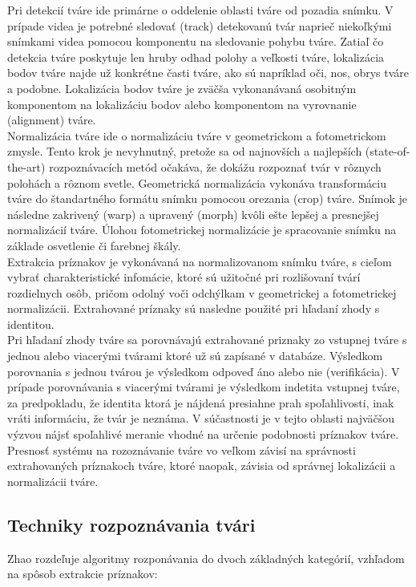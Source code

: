 \indent  Pri detekcií tváre ide primárne o oddelenie oblasti tváre od pozadia snímku.
V prípade videa je potrebné sledovať (track) detekovanú tvár naprieč niekoľkými snímkami videa pomocou komponentu na sledovanie pohybu tváre.
Zatiaľ čo detekcia tváre poskytuje len hruby odhad polohy a veľkosti tváre, lokalizácia bodov tváre najde už konkrétne časti tváre,
ako sú napríklad oči, nos, obrys tváre a podobne.
Lokalizácia bodov tváre je zväčša vykonanávaná osobitným komponentom na lokalizáciu bodov alebo komponentom na vyrovnanie (alignment) tváre.\cite{handbookface}\\
Normalizácia tváre ide o normalizáciu tváre v geometrickom a fotometrickom zmysle.
Tento krok je nevyhnutný, pretože sa od najnovších a najlepších (state-of-the-art) rozpoznávacích metód očakáva, že dokážu rozpoznať tvár v rôznych polohách a rôznom svetle.
Geometrická normalizácia vykonáva transformáciu tváre do štandartného formátu snímku pomocou orezania (crop) tváre.
Snímok je následne zakrivený (warp) a upravený (morph) kvôli ešte lepšej a presnejšej normalizácií tváre.
Úlohou fotometrickej normalizácie je spracovanie snímku na základe osvetlenie či farebnej škály.\cite{handbookface}\\
\indent Extrakcia príznakov je vykonávaná na normalizovanom snímku tváre, s cieľom vybrať charakteristické infomácie, ktoré sú užitočné pri rozlišovaní tvárí rozdielnych osôb,
pričom odolný voči odchýlkam v geometrickej a fotometrickej normalizácii.
Extrahované príznaky sú nasledne použité pri hľadaní zhody s identitou.\cite{handbookface}\\
\indent Pri hľadaní zhody tváre sa porovnávajú extrahované priznaky zo vstupnej tváre s jednou alebo viacerými tvárami ktoré už sú zapísané v databáze.
Výsledkom porovnania s jednou tvárou je výsledkom odpoveď áno alebo nie (verifikácia).
V prípade porovnávania s viacerými tvárami je výsledkom indetita vstupnej tváre, za predpokladu, že identita ktorá je nájdená presiahne prah spoľahlivosti,
inak vráti informáciu, že tvár je neznáma.
V súčastnosti je v tejto oblasti najväčšou výzvou nájsť spoľahlivé meranie vhodné na určenie podobnosti príznakov tváre.\cite{handbookface}\\
\indent Presnosť systému na rozoznávanie tváre vo veľkom závisí na správnosti extrahovaných príznakoch tváre, ktoré naopak, závisia od správnej lokalizácii a normalizácii tváre.

\subsection{Techniky rozpoznávania tvári}
Zhao rozdeľuje\cite{zhao2003face} algoritmy rozponávania do dvoch základných kategórií, vzhľadom na spôsob extrakcie príznakov:

